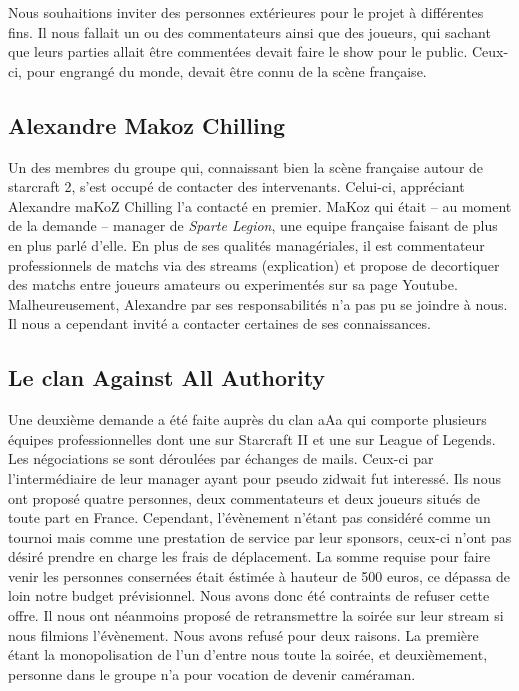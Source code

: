 Nous souhaitions inviter des personnes extérieures pour le projet à
différentes fins. Il nous fallait un ou des commentateurs ainsi que des
joueurs, qui sachant que leurs parties allait être commentées devait faire
le show pour le public. Ceux-ci, pour engrangé du monde, devait être
connu de la scène française.

\subsection{Alexandre \og Makoz \fg{} Chilling}%
\label{sub:alexandre_makoz_chilling}

Un des membres du groupe qui, connaissant bien la scène française autour
de starcraft 2, s'est occupé de contacter des intervenants.  Celui-ci,
appréciant Alexandre \og maKoZ \fg{} Chilling l'a contacté en premier. MaKoz qui
était -- au moment de la demande -- manager de \emph{Sparte Legion}, une equipe
française faisant de plus en plus parlé d'elle. En plus de ses qualités
managériales, il est commentateur professionnels de matchs via des
streams (explication) et propose de decortiquer des matchs entre joueurs
amateurs ou experimentés sur sa page Youtube. Malheureusement, Alexandre
par ses responsabilités n'a pas pu se joindre à nous. Il nous a
cependant invité a contacter certaines de ses connaissances.

\subsection{Le clan \og Against All Authority \fg{}}%
\label{sub:le_clan_all_against_authority}

Une deuxième demande a été faite auprès du clan \og aAa \fg{} qui
comporte plusieurs équipes professionnelles dont une sur Starcraft II et
une sur League of Legends. Les négociations se sont déroulées par
échanges de mails.  Ceux-ci par l'intermédiaire de leur manager ayant
pour pseudo \og zidwait \fg{} fut interessé. Ils nous ont proposé quatre
personnes, deux commentateurs et deux joueurs situés de toute part en
France.  Cependant, l'évènement n'étant pas considéré comme un tournoi
mais comme une prestation de service par leur sponsors, ceux-ci n'ont
pas désiré prendre en charge les frais de déplacement. La somme requise
pour faire venir les personnes consernées était éstimée à hauteur de 500
euros, ce dépassa de loin notre budget prévisionnel. Nous avons donc été
contraints de refuser cette offre. Il nous ont néanmoins proposé de
retransmettre la soirée sur leur stream si nous filmions l'évènement.
Nous avons refusé pour deux raisons. La première étant la monopolisation
de l'un d'entre nous toute la soirée, et deuxièmement, personne dans le
groupe n'a pour vocation de devenir caméraman.

